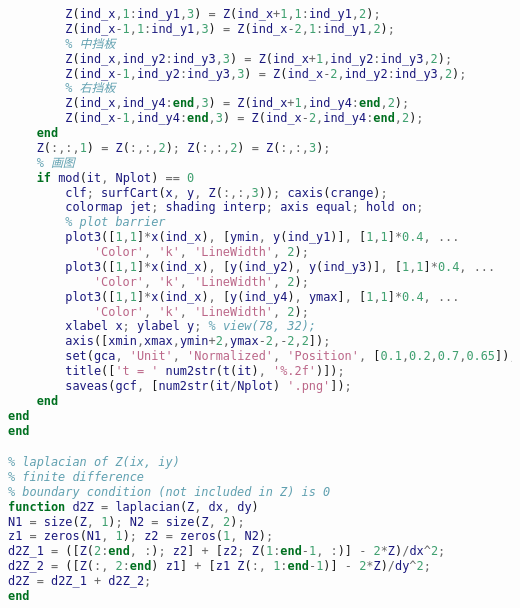 \begin{lstlisting}[language=matlab, caption=double\_slit.m]
        % 左挡板
        Z(ind_x,1:ind_y1,3) = Z(ind_x+1,1:ind_y1,2);
        Z(ind_x-1,1:ind_y1,3) = Z(ind_x-2,1:ind_y1,2);
        % 中挡板
        Z(ind_x,ind_y2:ind_y3,3) = Z(ind_x+1,ind_y2:ind_y3,2);
        Z(ind_x-1,ind_y2:ind_y3,3) = Z(ind_x-2,ind_y2:ind_y3,2);
        % 右挡板
        Z(ind_x,ind_y4:end,3) = Z(ind_x+1,ind_y4:end,2);
        Z(ind_x-1,ind_y4:end,3) = Z(ind_x-2,ind_y4:end,2);
    end
    Z(:,:,1) = Z(:,:,2); Z(:,:,2) = Z(:,:,3);
    % 画图
    if mod(it, Nplot) == 0
        clf; surfCart(x, y, Z(:,:,3)); caxis(crange);
        colormap jet; shading interp; axis equal; hold on;
        % plot barrier
        plot3([1,1]*x(ind_x), [ymin, y(ind_y1)], [1,1]*0.4, ...
            'Color', 'k', 'LineWidth', 2);
        plot3([1,1]*x(ind_x), [y(ind_y2), y(ind_y3)], [1,1]*0.4, ...
            'Color', 'k', 'LineWidth', 2);
        plot3([1,1]*x(ind_x), [y(ind_y4), ymax], [1,1]*0.4, ...
            'Color', 'k', 'LineWidth', 2);
        xlabel x; ylabel y; % view(78, 32);
        axis([xmin,xmax,ymin+2,ymax-2,-2,2]);
        set(gca, 'Unit', 'Normalized', 'Position', [0.1,0.2,0.7,0.65]);
        title(['t = ' num2str(t(it), '%.2f')]);
        saveas(gcf, [num2str(it/Nplot) '.png']);
    end
end
end

% laplacian of Z(ix, iy)
% finite difference
% boundary condition (not included in Z) is 0
function d2Z = laplacian(Z, dx, dy)
N1 = size(Z, 1); N2 = size(Z, 2);
z1 = zeros(N1, 1); z2 = zeros(1, N2);
d2Z_1 = ([Z(2:end, :); z2] + [z2; Z(1:end-1, :)] - 2*Z)/dx^2;
d2Z_2 = ([Z(:, 2:end) z1] + [z1 Z(:, 1:end-1)] - 2*Z)/dy^2;
d2Z = d2Z_1 + d2Z_2;
end
\end{lstlisting}
